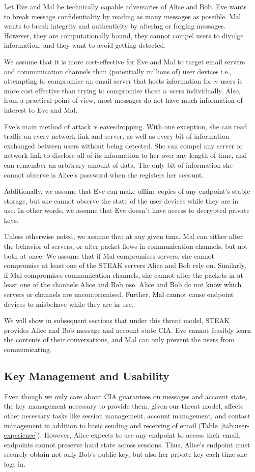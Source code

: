 Let Eve and Mal be technically capable adversaries of Alice and Bob.  Eve wants to break message confidentiality by reading as many messages as possible.  Mal wants to break integrity and authenticity by altering or forging messages.  However, they are computationally bound, they cannot compel users to divulge information, and they want to avoid getting detected.

We assume that it is more cost-effective for Eve and Mal to target email servers and communication channels than (potentially millions of) user devices i.e., attempting to compromise an email server that hosts information for $n$ users is more cost effective than trying to compromise those $n$ users individually. Also, from a practical point of view, most messages do not have much information of interest to Eve and Mal.

Eve’s main method of attack is eavesdropping.  With one exception, she can read traffic on every network link and server, as well as every bit of information exchanged between users without being detected.  She can compel any server or network link to disclose all of its information to her over any length of time, and can remember an arbitrary amount of data.  The only bit of information she cannot observe is Alice's password when she registers her account.

Additionally, we assume that Eve can make offline copies of any endpoint’s stable storage, but she cannot observe the state of the user devices while they are in use. In other words, we assume that Eve doesn’t have access to decrypted private keys.  

Unless otherwise noted, we assume that at any given time, Mal can either alter the behavior of servers, or alter packet flows in communication channels, but not both at once. We assume that if Mal compromises servers, she cannot compromise at least one of the STEAK servers Alice and Bob rely on. Similarly, if Mal compromises communication channels, she cannot alter the packets in at least one of the channels Alice and Bob use.  Alice and Bob do not know which servers or channels are uncompromised.  Further, Mal cannot cause endpoint devices to misbehave while they are in use.

We will show in subsequent sections that under this threat model, STEAK provides Alice and Bob message and account state CIA.  Eve cannot feasibly learn the contents of their conversations, and Mal can only prevent the users from communicating.

\subsection{Key Management and Usability}
Even though we only care about CIA guarantees on messages and account 
state, the key management necessary to provide them, given our threat 
model, affects other necessary tasks like session management, account 
management, and contact management in addition to basic sending and 
receiving of email (Table~\ref{tab:user-experience}). However, Alice
expects to use any endpoint to access
their email, endpoints cannot preserve hard state across sessions.  
Thus, Alice’s endpoint must securely obtain not only Bob’s public key, 
but also her private key each time she logs in.

